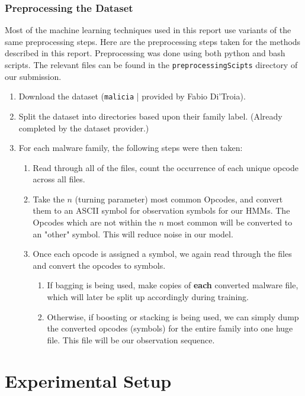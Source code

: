 \documentclass[12pt]{article}
\begin{document}
\section{Preprocessing the Dataset}
Most of the machine learning techniques used in this report use variants of the same preprocessing steps. Here are the preprocessing steps taken for the methods described in this report. Preprocessing was done using both python and bash scripts. The relevant files can be found in the \texttt{preprocessingScipts} directory of our submission.
  \begin{enumerate}
  \item Download the dataset (\texttt{malicia} | provided by Fabio Di'Troia).
    \item Split the dataset into directories based upon their family label. (Already completed by the dataset provider.)
    \item For each malware family, the following steps were then taken:
      \begin{enumerate}
        \item Read through all of the files, count the occurrence of each unique opcode across all files.
        \item Take the $n$ (turning parameter) most common Opcodes, and convert them to an ASCII symbol for observation symbols for our HMMs. The Opcodes which are not within the $n$ most common will be converted to an "other" symbol. This will reduce noise in our model.
        \item Once each opcode is assigned a symbol, we again read through the files and convert the opcodes to symbols.
        \begin{enumerate}
          \item If bagging is being used, make copies of \textbf{each} converted malware file, which will later be split up accordingly during training.
          \item Otherwise, if boosting or stacking is being used, we can simply dump the converted opcodes (symbols) for the entire family into one huge file. This file will be our observation sequence.
        \end{enumerate}
      \end{enumerate}
  \end{enumerate}




\part{Experimental Setup}
\end{document}
